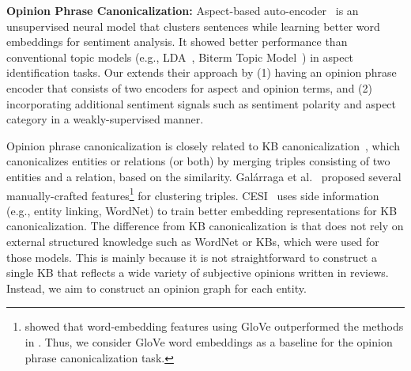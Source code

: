 \noindent
{\bf Opinion Phrase Canonicalization:}
Aspect-based auto-encoder~\cite{he2017unsupervised} is an unsupervised neural model that clusters sentences while learning better word embeddings for sentiment analysis. It showed better performance than conventional topic models (e.g., LDA~\cite{Blei:2003:LDA}, Biterm Topic Model~\cite{Yan:2013:BTM}) in aspect identification tasks. 
Our \canonical{} extends their approach by (1) having an opinion phrase encoder that consists of two encoders for aspect and opinion terms, and (2) incorporating additional sentiment signals such as sentiment polarity and aspect category in a weakly-supervised manner.

Opinion phrase canonicalization is closely related to KB canonicalization~\cite{Galarraga:2014:CIKM:Canonicalizing,Vahishth:2018:CESI}, which canonicalizes entities or relations (or both) by merging triples consisting of two entities and a relation, based on the similarity. Gal\'{a}rraga et al.~\cite{Galarraga:2014:CIKM:Canonicalizing} proposed several manually-crafted features\footnote{\cite{Vahishth:2018:CESI} showed that word-embedding features using GloVe outperformed the methods in \cite{Galarraga:2014:CIKM:Canonicalizing}. Thus, we consider GloVe word embeddings as a baseline for the opinion phrase canonicalization task.} for clustering triples.
CESI~\cite{Vahishth:2018:CESI} uses side information (e.g., entity linking, WordNet) to train better embedding representations for KB canonicalization.
The difference from KB canonicalization is that \system{} does not rely on external structured knowledge such as WordNet or KBs, which were used for those models. This is mainly because it is not straightforward to construct a single KB that reflects a wide variety of subjective opinions written in reviews. Instead, we aim to construct an opinion graph for each entity.
